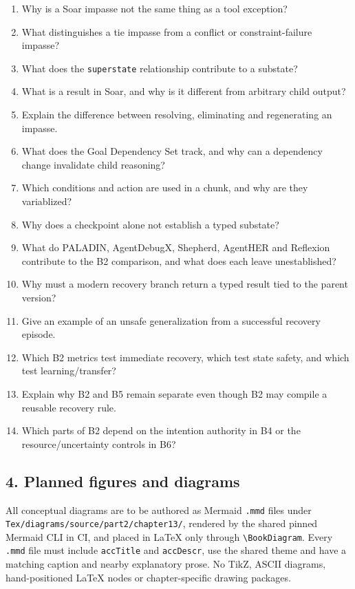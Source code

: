 \begin{enumerate}
\def\labelenumi{\arabic{enumi}.}
\tightlist
\item
  Why is a Soar impasse not the same thing as a tool exception?
\item
  What distinguishes a tie impasse from a conflict or constraint-failure impasse?
\item
  What does the \texttt{superstate} relationship contribute to a substate?
\item
  What is a result in Soar, and why is it different from arbitrary child output?
\item
  Explain the difference between resolving, eliminating and regenerating an impasse.
\item
  What does the Goal Dependency Set track, and why can a dependency change invalidate child reasoning?
\item
  Which conditions and action are used in a chunk, and why are they variablized?
\item
  Why does a checkpoint alone not establish a typed substate?
\item
  What do PALADIN, AgentDebugX, Shepherd, AgentHER and Reflexion contribute to the B2 comparison, and what does each leave unestablished?
\item
  Why must a modern recovery branch return a typed result tied to the parent version?
\item
  Give an example of an unsafe generalization from a successful recovery episode.
\item
  Which B2 metrics test immediate recovery, which test state safety, and which test learning/transfer?
\item
  Explain why B2 and B5 remain separate even though B2 may compile a reusable recovery rule.
\item
  Which parts of B2 depend on the intention authority in B4 or the resource/uncertainty controls in B6?
\end{enumerate}

\subsection{4. Planned figures and diagrams}\label{planned-figures-and-diagrams}

All conceptual diagrams are to be authored as Mermaid \texttt{.mmd} files under \texttt{Tex/diagrams/source/part2/chapter13/}, rendered by the shared pinned Mermaid CLI in CI, and placed in LaTeX only through \texttt{\textbackslash{}BookDiagram}. Every \texttt{.mmd} file must include \texttt{accTitle} and \texttt{accDescr}, use the shared theme and have a matching caption and nearby explanatory prose. No TikZ, ASCII diagrams, hand-positioned LaTeX nodes or chapter-specific drawing packages.

